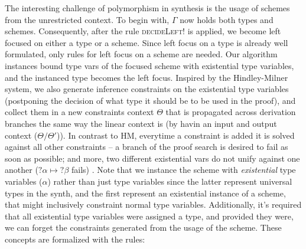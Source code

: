\documentclass{llncs}
\def\Rho{P}
\begin{document}
The interesting challenge of polymorphism in synthesis is the usage of
schemes from the unrestricted context.  To begin with, $\Gamma$ now
holds both types and schemes. Consequently, after the rule
\textsc{decideLeft!} is applied, we become left focused on either a
type or a scheme. Since left focus on a type is already well
formulated, only rules for left focus on a scheme are needed. Our
algorithm instances bound type vars of the focused scheme with
existential type variables, and the instanced type becomes the left
focus. Inspired by the Hindley-Milner system, we also generate
inference constraints on the existential type variables (postponing
the decision of what type it should be to be used in the proof), and
collect them in a new constraints context $\Theta$ that is propagated
across derivation branches the same way the linear context is (by
havin an input and output context ($\Theta/\Theta'$)).  In contrast to
HM, everytime a constraint is added it is solved against all other
constraints -- a branch of the proof search is desired to fail as soon
as possible; and more, two different existential vars do not unify
against one another ($?\alpha \mapsto ?\beta$ fails) . Note that we
instance the scheme with \emph{existential} type variables ($\alpha$)
rather than just type variables since the latter represent universal
types in the synth, and the first represent an existential instance of
a scheme, that might inclusively constraint normal type
variables. Additionally, it's required that all existential type
variables were assigned a type, and provided they were, we can forget
the constraints generated from the usage of the scheme. These concepts
are formalized with the rules:
\end{document}
